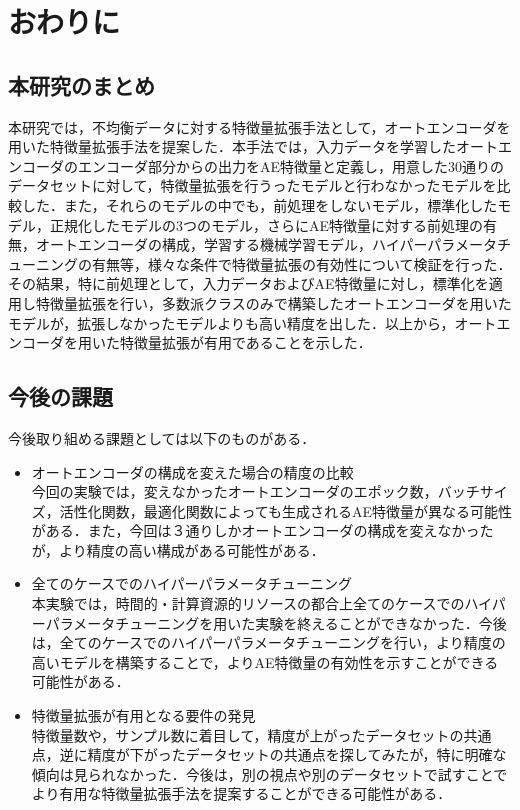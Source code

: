 \chapter{おわりに}
\section{本研究のまとめ}
本研究では，不均衡データに対する特徴量拡張手法として，オートエンコーダを用いた特徴量拡張手法を提案した．本手法では，入力データを学習したオートエンコーダのエンコーダ部分からの出力をAE特徴量と定義し，用意した30通りのデータセットに対して，特徴量拡張を行うったモデルと行わなかったモデルを比較した．また，それらのモデルの中でも，前処理をしないモデル，標準化したモデル，正規化したモデルの3つのモデル，さらにAE特徴量に対する前処理の有無，オートエンコーダの構成，学習する機械学習モデル，ハイパーパラメータチューニングの有無等，様々な条件で特徴量拡張の有効性について検証を行った．\\
その結果，特に前処理として，入力データおよびAE特徴量に対し，標準化を適用し特徴量拡張を行い，多数派クラスのみで構築したオートエンコーダを用いたモデルが，拡張しなかったモデルよりも高い精度を出した．以上から，オートエンコーダを用いた特徴量拡張が有用であることを示した．

\section{今後の課題}
今後取り組める課題としては以下のものがある．
\begin{itemize}
    \item オートエンコーダの構成を変えた場合の精度の比較\\
    今回の実験では，変えなかったオートエンコーダのエポック数，バッチサイズ，活性化関数，最適化関数によっても生成されるAE特徴量が異なる可能性がある．また，今回は３通りしかオートエンコーダの構成を変えなかったが，より精度の高い構成がある可能性がある．
    \item 全てのケースでのハイパーパラメータチューニング\\
    本実験では，時間的・計算資源的リソースの都合上全てのケースでのハイパーパラメータチューニングを用いた実験を終えることができなかった．今後は，全てのケースでのハイパーパラメータチューニングを行い，より精度の高いモデルを構築することで，よりAE特徴量の有効性を示すことができる可能性がある．
    \item 特徴量拡張が有用となる要件の発見\\
    特徴量数や，サンプル数に着目して，精度が上がったデータセットの共通点，逆に精度が下がったデータセットの共通点を探してみたが，特に明確な傾向は見られなかった．今後は，別の視点や別のデータセットで試すことでより有用な特徴量拡張手法を提案することができる可能性がある．

\end{itemize}